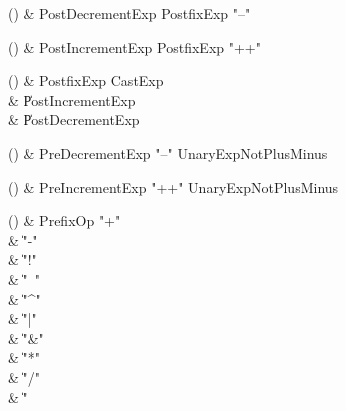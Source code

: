 \begin{bbgrammarappendix}

() & PostDecrementExp \label{prod:PostDecrementExp}  \: PostfixExp \xcd"--"  \\


\end{bbgrammarappendix}

\begin{bbgrammarappendix}

() & PostIncrementExp \label{prod:PostIncrementExp}  \: PostfixExp \xcd"++"  \\


\end{bbgrammarappendix}

\begin{bbgrammarappendix}

() & PostfixExp \label{prod:PostfixExp}  \: CastExp  \\

 &    \| PostIncrementExp \\
 &    \| PostDecrementExp \\

\end{bbgrammarappendix}

\begin{bbgrammarappendix}

() & PreDecrementExp \label{prod:PreDecrementExp}  \: \xcd"--" UnaryExpNotPlusMinus  \\


\end{bbgrammarappendix}

\begin{bbgrammarappendix}

() & PreIncrementExp \label{prod:PreIncrementExp}  \: \xcd"++" UnaryExpNotPlusMinus  \\


\end{bbgrammarappendix}

\begin{bbgrammarappendix}

() & PrefixOp \label{prod:PrefixOp}  \: \xcd"+"  \\

 &    \| \xcd"-" \\
 &    \| \xcd"!" \\
 &    \| \xcd"~" \\
 &    \| \xcd"^" \\
 &    \| \xcd"|" \\
 &    \| \xcd"&" \\
 &    \| \xcd"*" \\
 &    \| \xcd"/" \\
 &    \| \xcd"%

\end{bbgrammarappendix}


